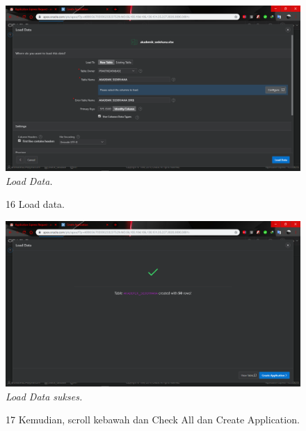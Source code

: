 \begin{enumerate}
\begin{figure}
    \begin{center}
\includegraphics[scale=0.2]{figures/5.png}
    \caption{\textit{Load Data.}}
        \end{center}
\label{gambar}
\end{figure}

\begin{figure}
\item[16] Load data.

    \begin{center}
\includegraphics[scale=0.2]{figures/6.png}
    \caption{\textit{Load Data sukses.}}
        \end{center}
\label{gambar}
\end{figure}

\begin{figure}
\item[17] Kemudian, scroll kebawah dan Check All dan Create Application. 


\end{figure}
\end{enumerate}
